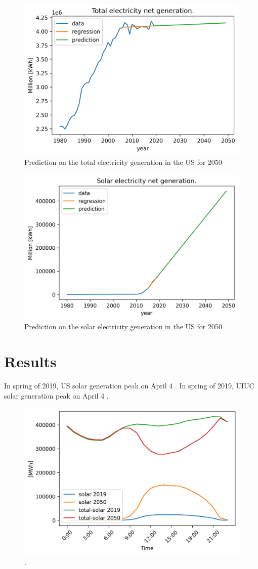 \documentclass{anstrans}
\begin{document}
\begin{figure}[H]
	\centering
	\includegraphics[width=0.7\linewidth]{figures/us-prediction1.png}
	\hfill
	\caption{Prediction on the total electricity generation in the \gls{US} for 2050}
	\label{fig:us-pred1}
\end{figure}

\begin{figure}[H]
	\centering
	\includegraphics[width=0.7\linewidth]{figures/us-prediction2.png}
	\hfill
	\caption{Prediction on the solar electricity generation in the \gls{US} for 2050}
	\label{fig:us-pred2}
\end{figure}

\section{Results}

In spring of 2019, US solar generation peak on April 4 .
In spring of 2019, UIUC solar generation peak on April 4 .

\begin{figure}[H]
	\centering
	\includegraphics[width=0.7\linewidth]{figures/duck-curve4.png}
	\hfill
	\caption{.}
	\label{fig:us-duck}
\end{figure}
\end{document}
